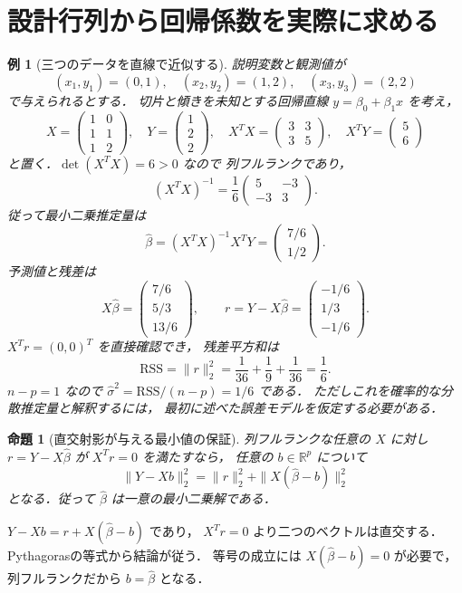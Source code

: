 \documentclass[a5paper,10pt,onecolumn]{jsarticle}
\makeatletter
\theoremstyle{mathnotetheorem}
\newtheorem{proposition}[theorem]{命題}
\newtheorem{example}[theorem]{例}
\renewcommand{\proofname}{証明}
\renewenvironment{proof}[1][\proofname]{%
  \par\pushQED{\qed}\normalfont\topsep4\p@\@plus2\p@\relax
  \trivlist\item[\hskip\labelsep\bfseries #1]\ignorespaces
}{\popQED\endtrivlist\@endpefalse}
\makeatother
\begin{document}
\section{設計行列から回帰係数を実際に求める}
\begin{example}[三つのデータを直線で近似する]\label{ex:regression-data}
説明変数と観測値が
\[
 (x_1,y_1)=(0,1),\quad
 (x_2,y_2)=(1,2),\quad
 (x_3,y_3)=(2,2)
\]
で与えられるとする．
切片と傾きを未知とする回帰直線
$y=\beta_0+\beta_1x$ を考え，
\[
 X=\begin{pmatrix}1&0\\1&1\\1&2\end{pmatrix},
 \quad Y=\begin{pmatrix}1\\2\\2\end{pmatrix},
 \quad
 X^TX=\begin{pmatrix}3&3\\3&5\end{pmatrix},
 \quad X^TY=\begin{pmatrix}5\\6\end{pmatrix}
\]
と置く．$\det(X^TX)=6>0$ なので
列フルランクであり，
\[
 (X^TX)^{-1}=\frac16
 \begin{pmatrix}5&-3\\-3&3\end{pmatrix}.
\]
従って最小二乗推定量は
\[
 \widehat\beta=
 (X^TX)^{-1}X^TY
 =\begin{pmatrix}7/6\\1/2\end{pmatrix}.
\]
予測値と残差は
\[
 X\widehat\beta=
 \begin{pmatrix}7/6\\5/3\\13/6\end{pmatrix},
 \qquad
 r=Y-X\widehat\beta=
 \begin{pmatrix}-1/6\\1/3\\-1/6\end{pmatrix}.
\]
$X^Tr=(0,0)^T$ を直接確認でき，
残差平方和は
\[
 \mathrm{RSS}=\|r\|_2^2
 =\frac1{36}+\frac19+\frac1{36}
 =\frac16.
\]
$n-p=1$ なので
$\widehat\sigma^2=\mathrm{RSS}/(n-p)=1/6$ である．
ただしこれを確率的な分散推定量と解釈するには，
最初に述べた誤差モデルを仮定する必要がある．
\end{example}
\begin{proposition}[直交射影が与える最小値の保証]
列フルランクな任意の $X$ に対し
$r=Y-X\widehat\beta$ が $X^Tr=0$ を満たすなら，
任意の $b\in\mathbb R^p$ について
\[
 \|Y-Xb\|_2^2
 =\|r\|_2^2+\|X(\widehat\beta-b)\|_2^2
\]
となる．従って $\widehat\beta$ は一意の最小二乗解である．
\end{proposition}
\begin{proof}
$Y-Xb=r+X(\widehat\beta-b)$ であり，
$X^Tr=0$ より二つのベクトルは直交する．
Pythagorasの等式から結論が従う．
等号の成立には $X(\widehat\beta-b)=0$ が必要で，
列フルランクだから $b=\widehat\beta$ となる．
\end{proof}
\end{document}
